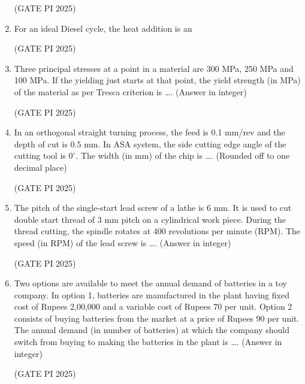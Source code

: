 \documentclass[journal,12pt,onecolumn]{IEEEtran}
\theoremstyle{remark}
\begin{document}
\begin{enumerate}
\hfill (GATE PI 2025)

\item For an ideal Diesel cycle, the heat addition is an

\begin{enumerate}
\end{enumerate}

\hfill (GATE PI 2025)

\item Three principal stresses at a point in a material are 300 MPa, 250 MPa and 100 MPa. If the yielding just starts at that point, the yield strength (in MPa) of the material as per Tresca criterion is \dots. (Answer in integer)

\hfill (GATE PI 2025)

\item In an orthogonal straight turning process, the feed is 0.1 mm/rev and the depth of cut is $0.5$ mm. In ASA system, the side cutting edge angle of the cutting tool is $0^\circ$. The width (in mm) of the chip is \dots. (Rounded off to one decimal place)

\hfill (GATE PI 2025)

\item The pitch of the single-start lead screw of a lathe is 6 mm. It is used to cut double start thread of 3 mm pitch on a cylindrical work piece. During the thread cutting, the spindle rotates at 400 revolutions per minute (RPM). The speed (in RPM) of the lead screw is \dots. (Answer in integer)

\hfill (GATE PI 2025)

\item Two options are available to meet the annual demand of batteries in a toy company. In option 1, batteries are manufactured in the plant having fixed cost of Rupees 2,00,000 and a variable cost of Rupees 70 per unit. Option 2 consists of buying batteries from the market at a price of Rupees 90 per unit. The annual demand (in number of batteries) at which the company should switch from buying to making the batteries in the plant is \dots. (Answer in integer)

\hfill (GATE PI 2025)


\end{enumerate}
\end{document}
